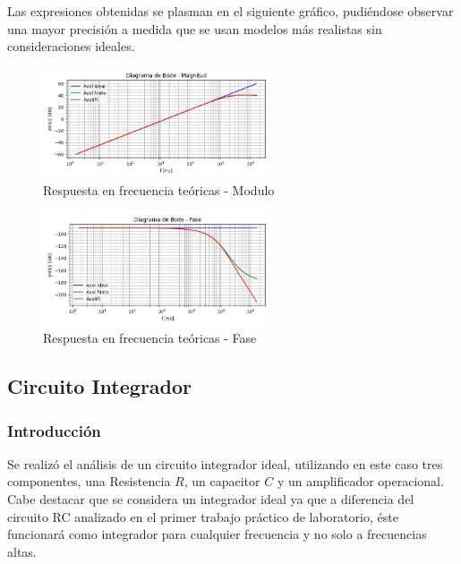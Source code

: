 Las expresiones obtenidas se plasman en el siguiente gráfico, pudiéndose 
observar una mayor precisión a medida que se usan modelos más realistas
sin consideraciones ideales.
\begin{figure}[H]
    \centering
    \includegraphics[width=0.6\textwidth]{../Ejercicio3-CircuitoIntegradoresyDerivadores/Imagenes/Derivador/bode_derivador magnitud.png}
    \caption{Respuesta en frecuencia teóricas - Modulo}
\end{figure}
\begin{figure}[H]
    \centering
    \includegraphics[width=0.6\textwidth]{../Ejercicio3-CircuitoIntegradoresyDerivadores/Imagenes/Derivador/bode_derivador_fase.png}
    \caption{Respuesta en frecuencia teóricas - Fase}
\end{figure}












\subsection{Circuito Integrador}

\subsubsection{Introducción}

Se realizó el análisis de un circuito integrador ideal, utilizando en este caso tres componentes, una Resistencia $R$,
un capacitor $C$ y un amplificador operacional. 
Cabe destacar que se considera un integrador ideal ya que a diferencia del circuito RC analizado en el primer trabajo práctico de laboratorio,
éste funcionará como integrador para cualquier frecuencia y no solo a frecuencias altas. 

